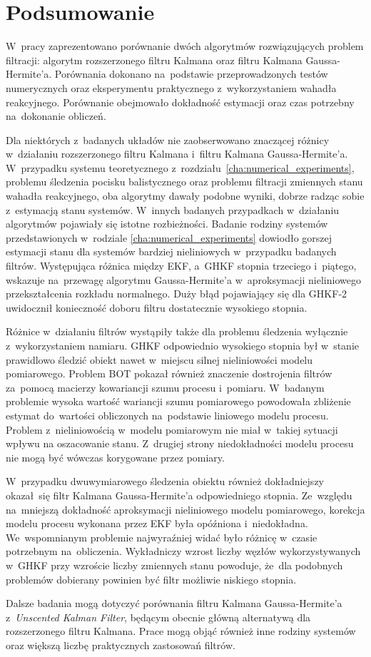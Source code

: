 \chapter{Podsumowanie}
\label{cha:summary}
W~pracy zaprezentowano porównanie dwóch algorytmów rozwiązujących problem filtracji: algorytm rozszerzonego filtru Kalmana oraz filtru Kalmana Gaussa-Hermite'a. Porównania dokonano na~podstawie przeprowadzonych testów numerycznych oraz eksperymentu praktycznego z~wykorzystaniem wahadła reakcyjnego. Porównanie obejmowało dokładność estymacji oraz czas potrzebny na~dokonanie obliczeń. \par
Dla niektórych z~badanych układów nie zaobserwowano znaczącej różnicy w~działaniu rozszerzonego filtru Kalmana i~filtru Kalmana Gaussa-Hermite'a. W~przypadku systemu teoretycznego z~rozdziału~\ref{cha:numerical_experiments}, problemu śledzenia pocisku balistycznego oraz problemu filtracji zmiennych stanu wahadła reakcyjnego, oba algorytmy dawały podobne wyniki, dobrze radząc sobie z~estymacją stanu systemów. W~innych badanych przypadkach w~działaniu algorytmów pojawiały się istotne rozbieżności. Badanie rodziny systemów przedstawionych w~rodziale \ref{cha:numerical_experiments} dowiodło gorszej estymacji stanu dla systemów bardziej nieliniowych w~przypadku badanych filtrów. Występująca różnica między EKF, a~GHKF stopnia trzeciego i~piątego, wskazuje na~przewagę algorytmu Gaussa-Hermite'a w~aproksymacji nieliniowego przekształcenia rozkładu normalnego. Duży błąd pojawiający się dla GHKF-2 uwidocznił konieczność doboru filtru dostatecznie wysokiego stopnia. \par
Różnice w~działaniu filtrów wystąpiły także dla problemu śledzenia wyłącznie z~wykorzystaniem namiaru. GHKF odpowiednio wysokiego stopnia był w~stanie prawidlowo śledzić obiekt nawet w~miejscu silnej nieliniowości modelu pomiarowego. Problem BOT pokazał również znaczenie dostrojenia filtrów za~pomocą macierzy kowariancji szumu procesu i~pomiaru. W~badanym problemie wysoka wartość wariancji szumu pomiarowego powodowała zbliżenie estymat do~wartości obliczonych na~podstawie liniowego modelu procesu. Problem z~nieliniowością w~modelu pomiarowym nie miał w~takiej sytuacji wpływu na oszacowanie stanu. Z~drugiej strony niedokładności modelu procesu nie mogą być wówczas korygowane przez pomiary. \par
W~przypadku dwuwymiarowego śledzenia obiektu również dokładniejszy okazał~się filtr Kalmana Gaussa-Hermite'a odpowiedniego stopnia. Ze~względu na~mniejszą dokładność aproksymacji nieliniowego modelu pomiarowego, korekcja modelu procesu wykonana przez EKF była opóźniona i~niedokładna. We~wspomnianym problemie najwyraźniej widać było różnicę w~czasie potrzebnym na~obliczenia. Wykładniczy wzrost liczby węzłów wykorzystywanych w~GHKF przy wzroście liczby zmiennych stanu powoduje, że~dla podobnych problemów dobierany powinien być filtr możliwie niskiego stopnia. \par
Dalsze badania mogą dotyczyć porównania filtru Kalmana Gaussa-Hermite'a z~\textit{Unscented Kalman Filter}, będącym obecnie główną alternatywą dla rozszerzonego filtru Kalmana. Prace mogą objąć również inne rodziny systemów oraz większą liczbę praktycznych zastosowań filtrów.